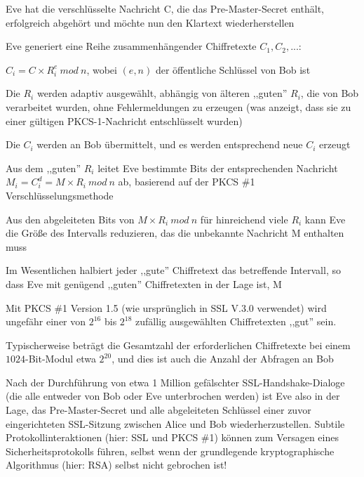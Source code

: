 \documentclass[a4paper]{article}
\begin{document}
\begin{multicols}{3}
\begin{itemize*}
\begin{itemize*}
\begin{itemize*}
                        \item Eve hat die verschlüsselte Nachricht C, die das Pre-Master-Secret enthält, erfolgreich abgehört und möchte nun den Klartext wiederherstellen
                        \item Eve generiert eine Reihe zusammenhängender Chiffretexte $C_1 , C_2 , ...$:
                        \begin{itemize*} \item $C_i = C\times R_i^e\ mod\ n$, wobei $(e, n)$ der öffentliche Schlüssel von Bob ist \item Die $R_i$ werden adaptiv ausgewählt, abhängig von älteren ,,guten'' $R_i$, die von Bob verarbeitet wurden, ohne Fehlermeldungen zu erzeugen (was anzeigt, dass sie zu einer gültigen PKCS-1-Nachricht entschlüsselt wurden) \item Die $C_i$ werden an Bob übermittelt, und es werden entsprechend neue $C_i$ erzeugt \item Aus dem ,,guten'' $R_i$ leitet Eve bestimmte Bits der entsprechenden Nachricht $M_i= C_i^d = M\times R_i\ mod\ n$ ab, basierend auf der PKCS \#1 Verschlüsselungsmethode \end{itemize*}
                        \item Aus den abgeleiteten Bits von $M\times R_i\ mod\ n$ für hinreichend viele $R_i$ kann Eve die Größe des Intervalls reduzieren, das die unbekannte Nachricht M enthalten muss
                        \item Im Wesentlichen halbiert jeder ,,gute'' Chiffretext das betreffende Intervall, so dass Eve mit genügend ,,guten'' Chiffretexten in der Lage ist, M
                        \item Mit PKCS \#1 Version 1.5 (wie ursprünglich in SSL V.3.0 verwendet) wird ungefähr einer von $2^{16}$ bis $2^{18}$ zufällig ausgewählten Chiffretexten ,,gut'' sein.
                        \item Typischerweise beträgt die Gesamtzahl der erforderlichen Chiffretexte bei einem $1024$-Bit-Modul etwa $2^{20}$, und dies ist auch die Anzahl der Abfragen an Bob
                        \item Nach der Durchführung von etwa 1 Million gefälschter SSL-Handshake-Dialoge (die alle entweder von Bob oder Eve unterbrochen werden) ist Eve also in der Lage, das Pre-Master-Secret und alle abgeleiteten Schlüssel einer zuvor eingerichteten SSL-Sitzung zwischen Alice und Bob wiederherzustellen. Subtile Protokollinteraktionen (hier: SSL und PKCS \#1) können zum Versagen eines Sicherheitsprotokolls führen, selbst wenn der grundlegende kryptographische Algorithmus (hier: RSA) selbst nicht gebrochen ist!

\end{itemize*}
\end{itemize*}
\end{itemize*}
\end{multicols}
\end{document}
